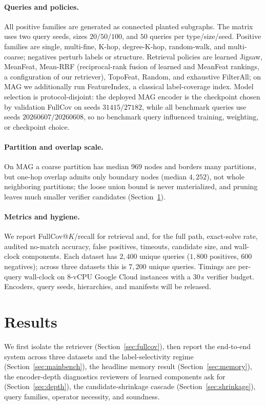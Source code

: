 \documentclass[sigconf, nonacm]{acmart}
\begin{document}
\paragraph{Queries and policies.}
All positive families are generated as connected planted subgraphs. The matrix uses two query seeds, sizes $20/50/100$, and $50$ queries per type/size/seed. Positive families are single, multi-fine, K-hop, degree-K-hop, random-walk, and multi-coarse; negatives perturb labels or structure. Retrieval policies are learned Jigsaw, MeanFeat, Mean-RRF (reciprocal-rank fusion of learned and MeanFeat rankings, a configuration of our retriever), TopoFeat, Random, and exhaustive FilterAll; on MAG we additionally run FeatureIndex, a classical label-coverage index. Model selection is protocol-disjoint: the deployed MAG encoder is the checkpoint chosen by validation FullCov on seeds $31415/27182$, while all benchmark queries use seeds $20260607/20260608$, so no benchmark query influenced training, weighting, or checkpoint choice.

\paragraph{Partition and overlap scale.}
On MAG a coarse partition has median $969$ nodes and borders many partitions, but one-hop overlap admits only boundary nodes (median $4{,}252$), not whole neighboring partitions; the loose union bound is never materialized, and pruning leaves much smaller verifier candidates (Section~\ref{sec:results}).

\paragraph{Metrics and hygiene.}
We report FullCov@$K$/recall for retrieval and, for the full path, exact-solve rate, audited no-match accuracy, false positives, timeouts, candidate size, and wall-clock components. Each dataset has $2{,}400$ unique queries ($1{,}800$ positives, $600$ negatives); across three datasets this is $7{,}200$ unique queries. Timings are per-query wall-clock on $8$-vCPU Google Cloud instances with a $30$\,s verifier budget. Encoders, query seeds, hierarchies, and manifests will be released.

\section{Results}
\label{sec:results}

We first isolate the retriever (Section~\ref{sec:fullcov}), then report the end-to-end system across three datasets and the label-selectivity regime (Section~\ref{sec:mainbench}), the headline memory result (Section~\ref{sec:memory}), the encoder-depth diagnostics reviewers of learned components ask for (Section~\ref{sec:depth}), the candidate-shrinkage cascade (Section~\ref{sec:shrinkage}), query families, operator necessity, and soundness.
\end{document}
